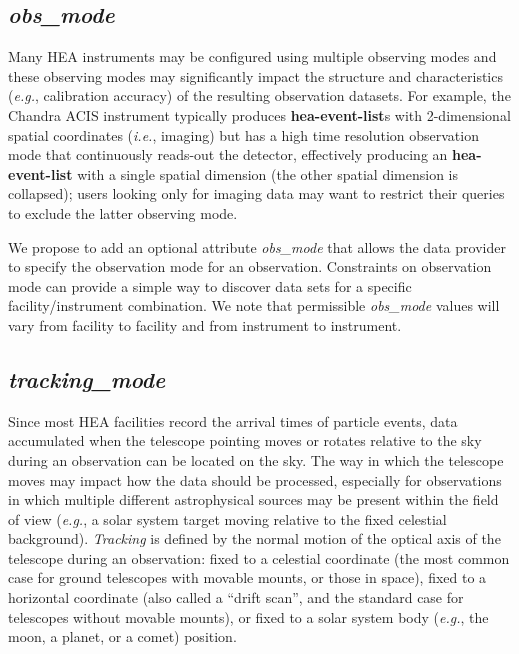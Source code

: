 \documentclass[11pt,a4paper]{ivoa}
\begin{document}
\subsection{{\em obs\_mode}}

Many \gls{HEA} instruments may be configured using multiple observing modes and these observing modes may significantly impact the structure and characteristics ({\em e.g.\/}, calibration accuracy) of the resulting observation datasets. For example, the Chandra ACIS instrument typically produces {\bf hea-event-list}s with 2-dimensional spatial coordinates ({\em i.e.\/}, imaging) but has a high time resolution observation mode that continuously reads-out the detector, effectively producing an {\bf hea-event-list} with a single spatial dimension (the other spatial dimension is collapsed); users looking only for imaging data may want to restrict their queries to exclude the latter observing mode.

We propose to add an optional attribute {\em obs\_mode\/} that allows the data provider to specify the observation mode for an observation.  Constraints on observation mode can provide a simple way to discover data sets for a specific facility/instrument combination.  We note that permissible {\em obs\_mode\/} values will vary from facility to facility and from instrument to instrument.


\subsection{{\em tracking\_mode}}

Since most \gls{HEA} facilities record the arrival times of particle events, data accumulated when the telescope pointing moves or rotates relative to the sky during an observation can be located on the sky.  The way in which the telescope moves may impact how the data should be processed, especially for observations in which multiple different astrophysical sources may be present within the field of view ({\em e.g.\/}, a solar system target moving relative to the fixed celestial background).  {\em Tracking\/} is defined by the normal motion of the optical axis of the telescope during an observation: fixed to a celestial coordinate (the most common case for ground telescopes with movable mounts, or those in space),  fixed to a horizontal coordinate (also called a ``drift scan'', and the standard case for telescopes without movable mounts),  or fixed to a solar system body ({\em e.g.\/}, the moon, a planet, or a comet) position.
\end{document}
